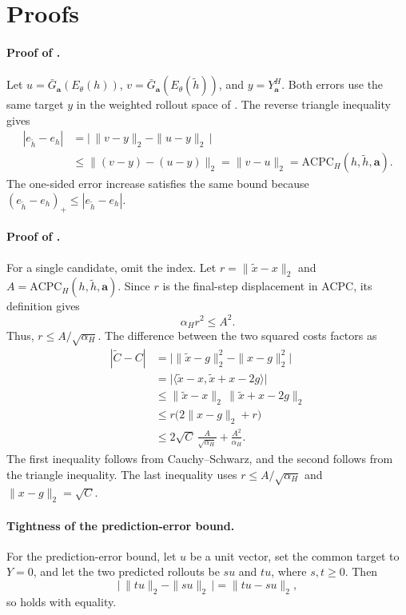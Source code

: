 \section{Proofs}\label{sec:appendix-acpc-proofs}

\paragraph{Proof of .}
Let $u=\bar G_{\mathbf a}(E_\theta(h))$,
$v=\bar G_{\mathbf a}(E_\theta(\tilde h))$, and $y=Y_{\mathbf a}^H$. Both
errors use the same target $y$ in the weighted rollout space of
. The reverse triangle inequality gives
\begin{align}
|e_{\tilde h}-e_h|
&=\bigl|\,\|v-y\|_2-\|u-y\|_2\,\bigr| \\
&\le \|(v-y)-(u-y)\|_2
=\|v-u\|_2
=\mathrm{ACPC}_H(h,\tilde h,\mathbf a).
\end{align}
The one-sided error increase satisfies the same bound because
$(e_{\tilde h}-e_h)_+\le|e_{\tilde h}-e_h|$.

\paragraph{Proof of .}
For a single candidate, omit the index. Let $r=\|\tilde x-x\|_2$ and
$A=\mathrm{ACPC}_H(h,\tilde h,\mathbf a)$. Since $r$ is the final-step
displacement in ACPC, its definition gives
\[
\alpha_H r^2\leq A^2.
\]
Thus, $r\leq A/\sqrt{\alpha_H}$. The difference between the two squared costs
factors as
\begin{align}
|\tilde C-C|
&=\bigl|\|\tilde x-g\|_2^2-\|x-g\|_2^2\bigr| \\
&=\bigl|\langle \tilde x-x,\tilde x+x-2g\rangle\bigr| \\
&\le \|\tilde x-x\|_2\,\|\tilde x+x-2g\|_2 \\
&\le r\bigl(2\|x-g\|_2+r\bigr) \\
&\le 2\sqrt C\,\frac{A}{\sqrt{\alpha_H}}
+\frac{A^2}{\alpha_H}.
\end{align}
The first inequality follows from Cauchy--Schwarz, and the second follows from
the triangle inequality. The last inequality uses $r\leq A/\sqrt{\alpha_H}$
and $\|x-g\|_2=\sqrt C$.

\paragraph{Tightness of the prediction-error bound.}
For the prediction-error bound, let
$u$ be a unit vector, set the common target to $Y=0$, and let the two predicted
rollouts be $su$ and $tu$, where $s,t\geq0$. Then
\[
\bigl|\,\|tu\|_2-\|su\|_2\,\bigr|
=\|tu-su\|_2,
\]
so  holds with equality.


